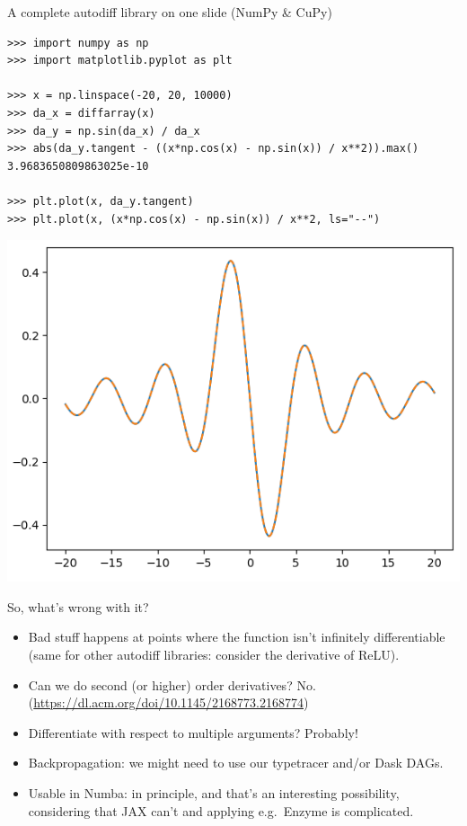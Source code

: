\documentclass[aspectratio=169]{beamer}
\begin{document}
\begin{frame}[fragile]{A complete autodiff library on one slide (NumPy \& CuPy)}
\vspace{0.2 cm}
\scriptsize
\begin{verbatim}
>>> import numpy as np
>>> import matplotlib.pyplot as plt

>>> x = np.linspace(-20, 20, 10000)
>>> da_x = diffarray(x)
>>> da_y = np.sin(da_x) / da_x
>>> abs(da_y.tangent - ((x*np.cos(x) - np.sin(x)) / x**2)).max()
3.9683650809863025e-10

>>> plt.plot(x, da_y.tangent)
>>> plt.plot(x, (x*np.cos(x) - np.sin(x)) / x**2, ls="--")
\end{verbatim}

\includegraphics[width=0.4\linewidth]{autodiff-plot.png}
\end{frame}

\begin{frame}{So, what's wrong with it?}
\large
\vspace{0.5 cm}
\begin{itemize}\setlength{\itemsep}{0.5 cm}
\item<1-> Bad stuff happens at points where the function isn't infinitely differentiable (same for other autodiff libraries: consider the derivative of ReLU).
\item<2-> Can we do second (or higher) order derivatives? No. {\scriptsize(\textcolor{blue}{\url{https://dl.acm.org/doi/10.1145/2168773.2168774}})}
\item<3-> Differentiate with respect to multiple arguments? Probably!
\item<4-> Backpropagation: we might need to use our typetracer and/or Dask DAGs.
\item<5-> Usable in Numba: in principle, and that's an interesting possibility, considering that JAX can't and applying e.g.\ Enzyme is complicated.
\end{itemize}

\vspace{0.5 cm}
\end{frame}
\end{document}
